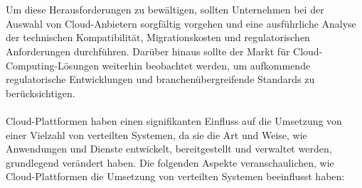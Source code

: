 \documentclass[../vs-script-first-v01.tex]{subfiles}
\begin{document}
\\\\
Um diese Herausforderungen zu bewältigen, sollten Unternehmen bei der Auswahl von Cloud-Anbietern sorgfältig vorgehen und eine ausführliche Analyse der technischen Kompatibilität, Migrationskosten und regulatorischen Anforderungen durchführen. Darüber hinaus sollte der Markt für Cloud-Computing-Lösungen weiterhin beobachtet werden, um aufkommende regulatorische Entwicklungen und branchenübergreifende Standards zu berücksichtigen.
\\\\
Cloud-Plattformen haben einen signifikanten Einfluss auf die Umsetzung von einer Vielzahl von verteilten Systemen, da sie die Art und Weise, wie Anwendungen und Dienste entwickelt, bereitgestellt und verwaltet werden, grundlegend verändert haben. Die folgenden Aspekte veranschaulichen, wie Cloud-Plattformen die Umsetzung von verteilten Systemen beeinflusst haben:
\end{document}
